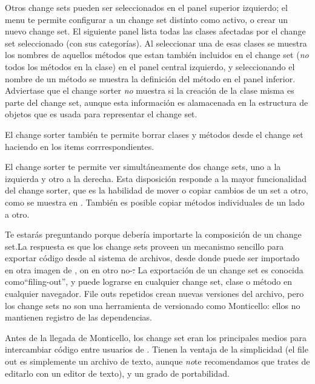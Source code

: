 \documentclass[spanish,a4paper,10pt,twoside]{book}
\begin{document}
Otros change sets pueden ser seleccionados en el panel superior izquierdo; el
menu  te permite configurar a un change set distinto como activo,
o crear un nuevo change set. El siguiente panel lista todas las clases afectadas por el change set seleccionado (con sus categorías). Al seleccionar una de esas clases se muestra los nombres de aquellos m\'etodos
que estan tambi\'en incluidos en el change set (\emph{no} todos los m\'etodos en
la clase) en el panel central izquierdo, y seleccionando el nombre de un
m\'etodo se muestra la definici\'on del método en el panel inferior. Adviertase
que el change sorter \emph{no} muestra si la creaci\'on de la clase misma es
parte del change set, aunque esta informaci\'on es alamacenada en la estructura
de objetos que es usada para representar el change set.

El change sorter tambi\'en te permite borrar clases y m\'etodos desde el change
set haciendo  en los items corrrespondientes.

El change sorter te permite ver simult\'aneamente dos change sets, uno a la
izquierda y otro a la derecha. Esta disposici\'on responde a la mayor
funcionalidad del change sorter, que es la habilidad de mover o copiar cambios
de un set a otro, como se muestra  en
. Tambi\'en es posible copiar m\'etodos individuales de un lado a otro.

Te estar\'as preguntando porque deber\'ia importarte la composici\'on de un
change set.La respuesta es que los change sets proveen un mecanismo sencillo para
exportar c\'odigo desde \pharo al sistema de archivos, desde donde puede ser
importado en otra imagen de \pharo, on en otro no-\pharo \st. La exportaci\'on
de un change set es conocida como``filing-out'', y puede lograrse
 en cualquier change set, clase o m\'etodo en cualquier navegador.
File outs repetidos crean nuevas versiones del archivo, pero los change
sets no son una herramienta de versionado como Monticello: ellos no
mantienen registro de las dependencias.

Antes de la llegada de Monticello, los change set eran los principales
medios para intercambiar c\'odigo entre usuarios de \pharo{}. Tienen la ventaja
de la simplicidad (el file out es simplemente un archivo de texto,
aunque \emph{no}te recomendamos que trates de editarlo con un editor de texto),
y un grado de portabilidad.
\end{document}
